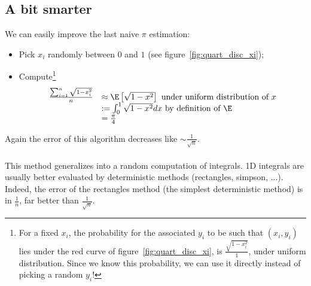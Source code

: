 \subsection{A bit smarter}

We can easily improve the last naive $\pi$ estimation:
\begin{itemize}
	\item Pick $x_i$ randomly between $0$ and $1$ (see figure~\ref{fig:quart_disc_xi});
	\item Compute\footnote{For a fixed $x_i$, the probability for the associated $y_i$ to be such that $(x_i,y_i)$ lies under the red curve of figure~\ref{fig:quart_disc_xi}, is $\frac{\sqrt{1-x_i^2}}{1}$, under uniform distribution. Since we know this probability, we can use it directly instead of picking a random $y_i$!}
\[
	\begin{array}{ll}
	\frac{\sum_{i=1}^n{\sqrt{1-x_i^2}}}{n}&\approx \E\left[\sqrt{1-x^2}\right] \text{  under uniform distribution of }x\\
	&:=\int_{0}^1{\sqrt{1-x^2} dx} \text{  by definition of } \E\\
	&=\frac{\pi}{4}
	\end{array}
\]
\end{itemize}

Again the error of this algorithm decreases like $\sim \frac{1}{\sqrt{n}}$.

\paragraph{}

This method generalizes into a random computation of integrals. 1D integrals are usually better evaluated by deterministic methods (rectangles, simpson, ...). Indeed, the error of the rectangles method (the simplest deterministic method) is in $\frac{1}{n}$, far better than $\frac{1}{\sqrt{n}}$.

